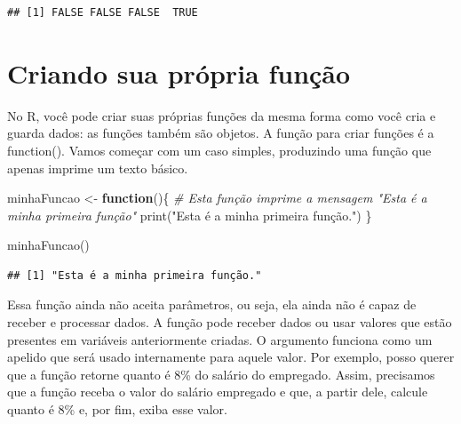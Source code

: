 \documentclass[
]{book}
\newenvironment{Shaded}{\begin{snugshade}}{\end{snugshade}}
\newcommand{\CommentTok}[1]{\textcolor[rgb]{0.56,0.35,0.01}{\textit{#1}}}
\newcommand{\ControlFlowTok}[1]{\textcolor[rgb]{0.13,0.29,0.53}{\textbf{#1}}}
\newcommand{\FunctionTok}[1]{\textcolor[rgb]{0.00,0.00,0.00}{#1}}
\newcommand{\NormalTok}[1]{#1}
\newcommand{\OtherTok}[1]{\textcolor[rgb]{0.56,0.35,0.01}{#1}}
\newcommand{\StringTok}[1]{\textcolor[rgb]{0.31,0.60,0.02}{#1}}
\begin{document}
\begin{verbatim}
## [1] FALSE FALSE FALSE  TRUE
\end{verbatim}

\hypertarget{criando-sua-pruxf3pria-funuxe7uxe3o}{%
\chapter{Criando sua própria função}\label{criando-sua-pruxf3pria-funuxe7uxe3o}}

No R, você pode criar suas próprias funções da mesma forma como você cria e guarda dados: as funções também são objetos. A função para criar funções é a function(). Vamos começar com um caso simples, produzindo uma função que apenas imprime um texto básico.

\begin{Shaded}
\begin{Highlighting}[]
\NormalTok{minhaFuncao }\OtherTok{\textless{}{-}} \ControlFlowTok{function}\NormalTok{()\{}
  \CommentTok{\# Esta função imprime a mensagem "Esta é a minha primeira função"}
  \FunctionTok{print}\NormalTok{(}\StringTok{"Esta é a minha primeira função."}\NormalTok{)}
\NormalTok{\}}
\end{Highlighting}
\end{Shaded}

\begin{Shaded}
\begin{Highlighting}[]
\FunctionTok{minhaFuncao}\NormalTok{()}
\end{Highlighting}
\end{Shaded}

\begin{verbatim}
## [1] "Esta é a minha primeira função."
\end{verbatim}

Essa função ainda não aceita parâmetros, ou seja, ela ainda não é capaz de receber e processar dados. A função pode receber dados ou usar valores que estão presentes em variáveis anteriormente criadas. O argumento funciona como um apelido que será usado internamente para aquele valor. Por exemplo, posso querer que a função retorne quanto é 8\% do salário do empregado. Assim, precisamos que a função receba o valor do salário empregado e que, a partir dele, calcule quanto é 8\% e, por fim, exiba esse valor.
\end{document}
